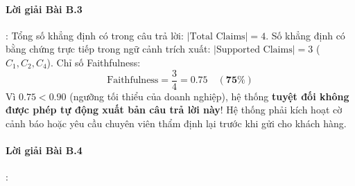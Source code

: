 \paragraph{Lời giải Bài B.3}:
Tổng số khẳng định có trong câu trả lời: $|\text{Total Claims}| = 4$.
Số khẳng định có bằng chứng trực tiếp trong ngữ cảnh trích xuất: $|\text{Supported Claims}| = 3$ ($C_1, C_2, C_4$).
Chỉ số Faithfulness:
\begin{equation*}
\text{Faithfulness} = \frac{3}{4} = 0.75 \quad (\mathbf{75\%})
\end{equation*}
Vì $0.75 < 0.90$ (ngưỡng tối thiểu của doanh nghiệp), hệ thống \textbf{tuyệt đối không được phép tự động xuất bản câu trả lời này}! Hệ thống phải kích hoạt cờ cảnh báo hoặc yêu cầu chuyên viên thẩm định lại trước khi gửi cho khách hàng.

\paragraph{Lời giải Bài B.4}:
